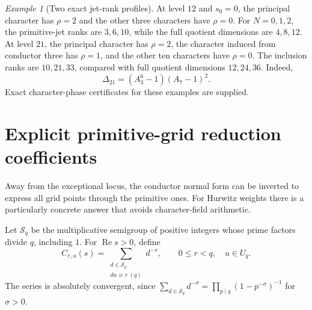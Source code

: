\documentclass[11pt]{article}
\numberwithin{equation}{section}
\theoremstyle{definition}
\theoremstyle{remark}
\newtheorem{example}[theorem]{Example}
\DeclareMathOperator{\Ree}{Re}
\begin{document}
\begin{example}[Two exact jet-rank profiles]
At level $12$ and $s_0=0$, the principal character has $\rho=2$ and the
other three characters have $\rho=0$. For $N=0,1,2$, the primitive-jet
ranks are $3,6,10$, while the full quotient dimensions are $4,8,12$.
At level $21$, the principal character has $\rho=2$, the character
induced from conductor three has $\rho=1$, and the other ten
characters have $\rho=0$. The inclusion ranks are $10,21,33$, compared
with full quotient dimensions $12,24,36$. Indeed,
\[
 \Delta_{21}=(A_3^6-1)(A_7-1)^2.
\]
Exact character-phase certificates for these examples are supplied.
\end{example}

\section{Explicit primitive-grid reduction coefficients}\label{sec:primitive}

Away from the exceptional locus, the conductor normal form can be
inverted to express all grid points through the primitive ones. For
Hurwitz weights there is a particularly concrete answer that avoids
character-field arithmetic.

Let $\mathcal S_q$ be the multiplicative semigroup of positive integers
whose prime factors divide $q$, including $1$. For $\Ree s>0$, define
\begin{equation}\label{eq:C-smooth}
 C_{r,u}(s)=\sum_{\substack{d\in\mathcal S_q\\du\equiv r\; (q)}}d^{-s},
 \qquad 0\le r<q,\quad u\in U_q.
\end{equation}
The series is absolutely convergent, since
$\sum_{d\in\mathcal S_q}d^{-\sigma}
=\prod_{p\mid q}(1-p^{-\sigma})^{-1}$ for $\sigma>0$.
\end{document}
